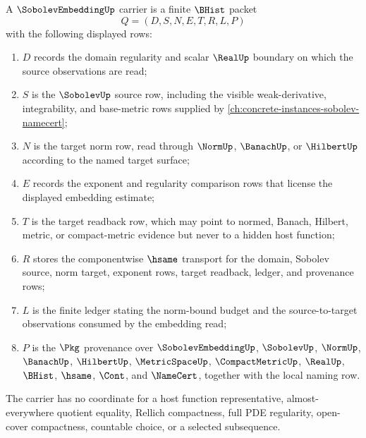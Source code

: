 \begin{definition}
\label{def:sobolev-embedding-carrier}
A $\SobolevEmbeddingUp$ carrier is a finite $\BHist$ packet
$$
Q=(D,S,N,E,T,R,L,P)
$$
with the following displayed rows:
\begin{enumerate}
\item $D$ records the domain regularity and scalar $\RealUp$ boundary on which the source observations are read;
\item $S$ is the $\SobolevUp$ source row, including the visible weak-derivative, integrability, and base-metric rows supplied by \autoref{ch:concrete-instances-sobolev-namecert};
\item $N$ is the target norm row, read through $\NormUp$, $\BanachUp$, or $\HilbertUp$ according to the named target surface;
\item $E$ records the exponent and regularity comparison rows that license the displayed embedding estimate;
\item $T$ is the target readback row, which may point to normed, Banach, Hilbert, metric, or compact-metric evidence but never to a hidden host function;
\item $R$ stores the componentwise $\hsame$ transport for the domain, Sobolev source, norm target, exponent rows, target readback, ledger, and provenance rows;
\item $L$ is the finite ledger stating the norm-bound budget and the source-to-target observations consumed by the embedding read;
\item $P$ is the $\Pkg$ provenance over $\SobolevEmbeddingUp$, $\SobolevUp$, $\NormUp$, $\BanachUp$, $\HilbertUp$, $\MetricSpaceUp$, $\CompactMetricUp$, $\RealUp$, $\BHist$, $\hsame$, $\Cont$, and $\NameCert$, together with the local naming row.
\end{enumerate}
The carrier has no coordinate for a host function representative, almost-everywhere quotient equality, Rellich compactness, full PDE regularity, open-cover compactness, countable choice, or a selected subsequence.
\end{definition}

